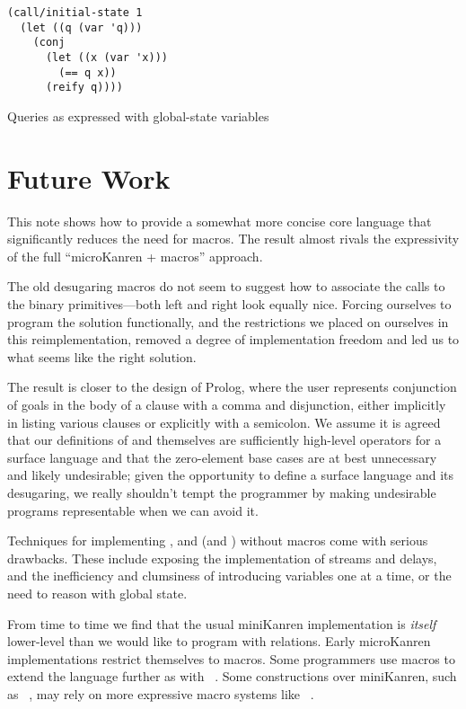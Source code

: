 \documentclass[sigplan,balance,pbalance,natbib=false]{acmart}
\begin{document}
\begin{listing}
  \begin{verbatim}
(call/initial-state 1
  (let ((q (var 'q)))
    (conj
      (let ((x (var 'x)))
        (== q x))
      (reify q))))
  \end{verbatim}
  \caption{Queries as expressed with global-state variables}\label{mnt:run-query}
\end{listing}

\section{Future Work}\label{sec:conclusion}

This note shows how to provide a somewhat more concise core language
that significantly reduces the need for macros. The result almost
rivals the expressivity of the full \enquote{microKanren + macros}
approach.

The old desugaring macros do not seem to suggest how to associate the
calls to the binary primitives---both left and right look equally
nice. Forcing ourselves to program the solution functionally, and the
restrictions we placed on ourselves in this reimplementation, removed
a degree of implementation freedom and led us to what seems like the
right solution.

The result is closer to the design of Prolog, where the user
represents conjunction of goals in the body of a clause with a comma
and disjunction, either implicitly in listing various clauses or
explicitly with a semicolon. We assume it is agreed that our
definitions of  and  themselves are
sufficiently high-level operators for a surface language and that the
zero-element base cases are at best unnecessary and likely
undesirable; given the opportunity to define a surface language and
its desugaring, we really shouldn't tempt the programmer by making
undesirable programs representable when we can avoid it.

Techniques for
implementing ,  and
 (and ) without macros come with
serious drawbacks. These include exposing the implementation of
streams and delays, and the inefficiency and clumsiness of introducing
variables one at a time, or the need to reason with global state.

From time to time we find that the usual miniKanren implementation is
\emph{itself} lower-level than we would like to program with
relations. Early microKanren implementations restrict themselves to
 macros. Some programmers use macros to
extend the language further as with
~\cite{keep2009pattern}. Some constructions over
miniKanren, such as
~\cite{ballantyne2020macros}, may rely on
more expressive macro systems like
~\cite{culpepper2012fortifying}.
\end{document}
